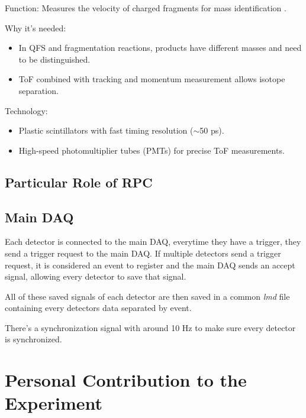 Function: Measures the velocity of charged fragments for mass identification \cite{heil_new_2022}.

Why it’s needed:

\begin{itemize}
	\item In \gls{QFS} and fragmentation reactions, products have different masses and need to be distinguished.
	\item ToF combined with tracking and momentum measurement allows isotope separation.
\end{itemize}

Technology:

\begin{itemize}
	\item Plastic scintillators with fast timing resolution ($\sim$50 ps).
	\item High-speed photomultiplier tubes (PMTs) for precise ToF measurements.
\end{itemize}



\subsection{Particular Role of RPC}

\cite{xarepe_resistive_2023}


\subsection{Main DAQ}

Each detector is connected to the main \gls{DAQ}, everytime they have a trigger, they send a trigger request to the main \gls{DAQ}. If multiple detectors send a trigger request, it is considered an event to register and the main \gls{DAQ} sends an accept signal, allowing every detector to save that signal.

All of these saved signals of each detector are then saved in a common \textit{lmd} file containing every detectors data separated by event.

There's a synchronization signal with around 10 Hz to make sure every detector is synchronized.


\section{Personal Contribution to the Experiment}